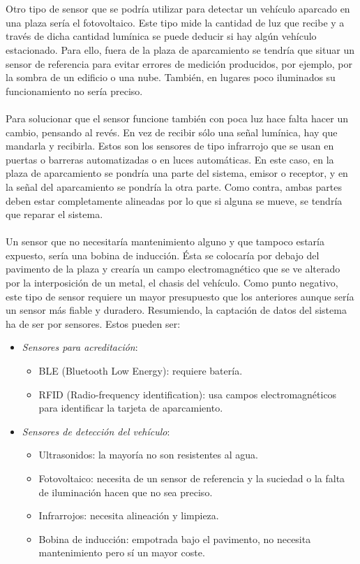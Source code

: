 \\\\
Otro tipo de sensor que se podría utilizar para detectar un vehículo aparcado en una plaza sería el fotovoltaico. Este tipo mide la cantidad de luz que recibe y a través de dicha cantidad lumínica se puede deducir si hay algún vehículo estacionado. Para ello, fuera de la plaza de aparcamiento se tendría que situar un sensor de referencia para evitar errores de medición producidos, por ejemplo, por la sombra de un edificio o una nube. También, en lugares poco iluminados su funcionamiento no sería preciso.
\\\\
Para solucionar que el sensor funcione también con poca luz hace falta hacer un cambio, pensando al revés. En vez de recibir sólo una señal lumínica, hay que mandarla y recibirla. Estos son los sensores de tipo infrarrojo que se usan en puertas o barreras automatizadas o en luces automáticas. En este caso, en la plaza de aparcamiento se pondría una parte del sistema, emisor o receptor, y en la señal del aparcamiento se pondría la otra parte. Como contra, ambas partes deben estar completamente alineadas por lo que si alguna se mueve, se tendría que reparar el sistema.
\\\\
Un sensor que no necesitaría mantenimiento alguno y que tampoco estaría expuesto, sería una bobina de inducción. Ésta se colocaría por debajo del pavimento de la plaza y crearía un campo electromagnético que se ve alterado por la interposición de un metal, el chasis del vehículo. Como punto negativo, este tipo de sensor requiere un mayor presupuesto que los anteriores aunque sería un sensor más fiable y duradero.
\newpage
Resumiendo, la captación de datos del sistema ha de ser por sensores. Estos pueden ser:
\begin{itemize}
	\item \textit{Sensores para acreditación}:
		\begin{itemize}
			\item BLE (Bluetooth Low Energy): requiere batería.
			\item RFID (Radio-frequency identification): usa campos electromagnéticos para identificar la tarjeta de aparcamiento.
		\end{itemize}
	\item \textit{Sensores de detección del vehículo}:
		\begin{itemize}
			\item Ultrasonidos: la mayoría no son resistentes al agua.
			\item Fotovoltaico: necesita de un sensor de referencia y la suciedad o la falta de iluminación hacen que no sea preciso.
			\item Infrarrojos: necesita alineación y limpieza.
			\item Bobina de inducción: empotrada bajo el pavimento, no necesita mantenimiento pero sí un mayor coste.
		\end{itemize}
\end{itemize}
